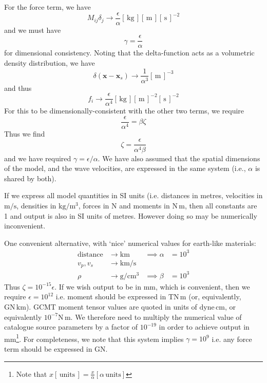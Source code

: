 \documentclass[a4paper,11pt]{article}
\newcommand{\metres}{\ensuremath{\left[\,\mathrm{m\,}\right]}}
\newcommand{\seconds}{\ensuremath{\left[\,\mathrm{s}\,\right]}}
\newcommand{\kg}{\ensuremath{\left[\,\mathrm{kg}\,\right]}}
\begin{document}
For the force term, we have
\begin{equation}
M_{ij}\delta_j \to \frac{\epsilon}{\alpha}\kg \metres \seconds^{-2}
\end{equation}
and we must have 
\begin{equation}
\gamma = \frac{\epsilon}{\alpha}
\end{equation}
for dimensional consistency. Noting that the delta-function acts as a volumetric density distribution, we have
\begin{equation}
\delta(\mathbf{x}-\mathbf{x}_s) \to \frac{1}{\alpha^3}\metres^{-3}
\end{equation}
and thus 
\begin{equation}
f_i \to \frac{\epsilon}{\alpha^4} \kg \metres^{-2}\seconds^{-2}
\end{equation}
For this to be dimensionally-consistent with the other two terms, we require
\begin{equation}
\frac{\epsilon}{\alpha^4} = \beta \zeta
\end{equation}
Thus we find
\begin{equation}
\zeta = \frac{\epsilon}{\alpha^4\beta}
\end{equation}
and we have required $\gamma = \epsilon/\alpha$. We have also assumed that the spatial dimensions of the model, and the wave velocities, are expressed in the same system (i.e., $\alpha$ is shared by both).

If we express all model quantities in SI units (i.e. distances in metres, velocities in $\mathrm{m}/\mathrm{s}$, densities in $\mathrm{kg}/\mathrm{m^3}$, forces in $\mathrm{N}$ and moments in $\mathrm{N\,m}$, then all constants are 1 and output is also in SI units of metres. However doing so may be numerically inconvenient.

One convenient alternative, with `nice' numerical values for earth-like materials:
\begin{align}
\mathrm{distance}&\to \mathrm{km} &\implies \alpha &= 10^3\\
v_p, v_s &\to \mathrm{km}/\mathrm{s}\\
\rho & \to \mathrm{g}/\mathrm{cm}^{3} &\implies \beta &= 10^3
\end{align}
Thus $\zeta =10^{-15}\epsilon$. If we wish output to be in mm, which is convenient, then we require $\epsilon=10^{12}$ i.e. moment should be expressed in $\mathrm{TN\,m}$ (or, equivalently, $\mathrm{GN\,km}$). GCMT moment tensor values are quoted in units of $\mathrm{dyne\,cm}$, or equivalently $10^{-7} \mathrm{N\,m}$. We therefore need to multiply the numerical value of catalogue source parameters by a factor of $10^{-19}$ in order to achieve output in mm\footnote{Note that $x [\,\mathrm{units}\,] = \frac{x}{\alpha} [\alpha\,\mathrm{units}]$}. For completeness, we note that this system implies $\gamma = 10^9$ i.e. any force term should be expressed in GN.
\end{document}
